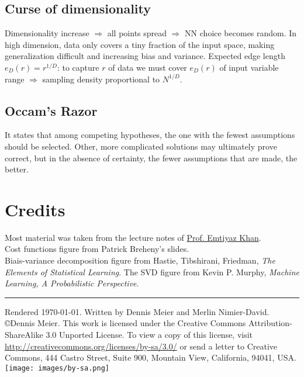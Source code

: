 \documentclass[10pt,a4paper,landscape]{article}
\begin{document}
\begin{multicols*}{4}
\subsection{Curse of dimensionality}
Dimensionality increase $\Rightarrow$ all points spread $\Rightarrow$ NN choice becomes random. 
In high dimension, data only covers a tiny fraction of the input space, making generalization difficult and increasing bias and variance.
Expected edge length $e_D(r) = r^{1/D}$: to capture $r$ of data we must cover $e_D(r)$ of input variable range $\Rightarrow$ sampling density proportional to $N^{1/D}$.





\subsection{Occam's Razor}
It states that among competing hypotheses, the one with the fewest assumptions should be selected. Other, more complicated solutions may ultimately prove correct, but in the absence of certainty, the fewer assumptions that are made, the better.



\section{Credits}
Most material was taken from the lecture notes of \href{http://people.epfl.ch/228491}{Prof. Emtiyaz Khan}.\\
Cost functions figure from Patrick Breheny's slides.\\
Biais-variance decomposition figure from Hastie, Tibshirani, Friedman, \textit{The Elements of Statistical Learning}.
The SVD figure from Kevin P. Murphy, \textit{Machine Learning, A Probabilistic Perspective}.

\hrule
\tiny
Rendered \today. Written by Dennis Meier and Merlin Nimier-David.
\copyright Dennis Meier. This work is licensed under the Creative Commons Attribution-ShareAlike 3.0 Unported License.
To view a copy of this license, visit \href{http://creativecommons.org/licenses/by-sa/3.0/}{http://creativecommons.org/licenses/by-sa/3.0/} or
send a letter to Creative Commons, 444 Castro Street, Suite 900, Mountain View, California, 94041, USA.
\texttt{[image: images/by-sa.png]}

\end{multicols*}
\end{document}
